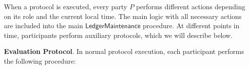 When a protocol is executed, every party $P$ performs different actions depending on its role and the current local time.
The main logic with all necessary actions are included into the main $\textsf{LedgerMaintenance}$ procedure.
At different points in time, participants perform auxiliary protocols, which we will describe below.

\bigbreak
\noindent
{}
\textbf{Evaluation Protocol}.\label{apndx:eval-protocol}
In normal protocol execution, each participant performs the following procedure:
\begin{protocol}
    \caption{$\textsf{EvaluationProcedure}(P, \text{sid}, R, sl, \mathcal{C}_{\text{loc}}, \mathbf{S}_{\text{id}})$}
\end{protocol}
